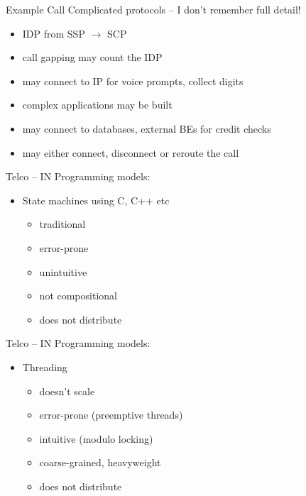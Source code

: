 \documentclass[ps,azure]{prosper}
\begin{document}
\begin{slide}{Example Call}
  Complicated protocols -- I don't remember full detail!
  \begin{itemize}
  \item IDP from SSP $\longrightarrow$ SCP
  \item call gapping may count the IDP
  \item may connect to IP for voice prompts, collect digits
  \item complex applications may be built
  \item may connect to databases, external BEs for credit checks
  \item may either connect, disconnect or reroute the call
  \end{itemize}
\end{slide}

\begin{slide}{Telco -- IN}
  Programming models:
  \begin{itemize}
  \item State machines using C, C++ etc
    \begin{itemize}
    \item traditional
    \item error-prone
    \item unintuitive
    \item not compositional
    \item does not distribute
    \end{itemize}
  \end{itemize}
\end{slide}

\begin{slide}{Telco -- IN}
  Programming models:
  \begin{itemize}
  \item Threading
    \begin{itemize}
    \item doesn't scale
    \item error-prone (preemptive threads)
    \item intuitive (modulo locking)
    \item coarse-grained, heavyweight
    \item does not distribute
    \end{itemize}
  \end{itemize}
\end{slide}
\end{document}
